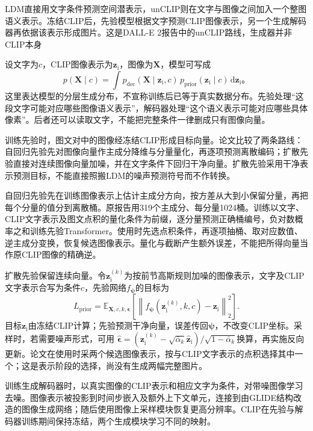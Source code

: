 LDM直接用文字条件预测空间潜表示，unCLIP则在文字与图像之间加入一个整图语义表示。冻结CLIP后，先验模型根据文字预测CLIP图像表示，另一个生成解码器再依据该表示形成图片。这是DALL-E 2报告中的unCLIP路线，生成器并非CLIP本身

设文字为$c$，CLIP图像表示为$\bm z_{\mathrm i}$，图像为$\bm X$，模型可写成
\begin{equation}
  p(\bm X\mid c)
  =\int p_{\mathrm{dec}}(\bm X\mid\bm z_{\mathrm i},c)\,
          p_{\mathrm{prior}}(\bm z_{\mathrm i}\mid c)\,
          \mathrm d\bm z_{\mathrm i}\text{。}
  \label{eq:vision-unclip-factorization}
\end{equation}
这里表达模型的分层生成分布，不宣称训练后已等于真实数据分布。先验处理“这段文字可能对应哪些图像语义表示”，解码器处理“这个语义表示可能对应哪些具体像素”。后者还可以读取文字，不能把完整条件一律删成只有图像向量。

训练先验时，图文对中的图像经冻结CLIP形成目标向量。论文比较了两条路线：自回归先验先对图像向量作主成分降维与分量量化，再逐项预测离散编码；扩散先验直接对连续图像向量加噪，并在文字条件下回归干净向量。扩散先验采用干净表示预测目标，不能直接照搬LDM的噪声预测符号而不作转换。

自回归先验先在训练图像表示上估计主成分方向，按方差从大到小保留分量，再把每个分量的值分到离散桶。原报告用319个主成分、每分量1024桶。训练以文字、CLIP文字表示及图文点积的量化条件为前缀，逐分量预测正确桶编号，负对数概率之和训练先验Transformer。使用时先选点积条件，再逐项抽桶、取对应数值、逆主成分变换，恢复候选图像表示。量化与截断产生额外误差，不能把所得向量当作原CLIP图像的精确逆。

扩散先验保留连续向量。令$\bm z_{\mathrm i}^{(k)}$为按前节高斯规则加噪的图像表示，文字及CLIP文字表示合写为条件$c$，先验网络$f_{\bm\psi}$的目标为
\begin{equation}
  L_{\mathrm{prior}}
   =\mathbb E_{\bm X,c,k,\bm\epsilon}
      \left[\left\lVert
         f_{\bm\psi}(\bm z_{\mathrm i}^{(k)},k,c)
           -\bm z_{\mathrm i}\right\rVert_2^2\right].
  \label{eq:vision-unclip-prior-objective}
\end{equation}
目标$\bm z_{\mathrm i}$由冻结CLIP计算；先验预测干净向量，误差传回$\bm\psi$，不改变CLIP坐标。采样时，若需要噪声形式，可用
$\widehat{\bm\epsilon}=(\bm z_{\mathrm i}^{(k)}-\sqrt{\bar\alpha_k}\widehat{\bm z}_{\mathrm i})/\sqrt{1-\bar\alpha_k}$换算，再实施反向更新。论文在使用时采两个候选图像表示，按与CLIP文字表示的点积选择其中一个；这是表示阶段的选择，尚没有生成两幅完整图片。

训练生成解码器时，以真实图像的CLIP表示和相应文字为条件，对带噪图像学习去噪。图像表示被投影到时间步嵌入及额外上下文单元，连接到由GLIDE结构改造的图像生成网络；随后使用图像上采样模块恢复更高分辨率。CLIP在先验与解码器训练期间保持冻结，两个生成模块学习不同的映射。

